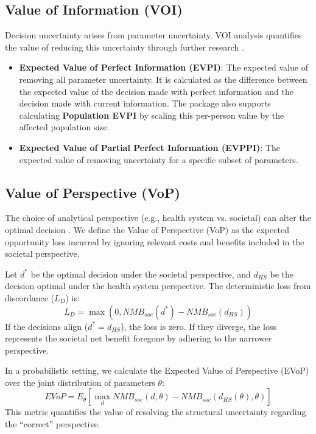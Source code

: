 \documentclass{article}
\begin{document}
\subsection{Value of Information (VOI)}
Decision uncertainty arises from parameter uncertainty. VOI analysis quantifies the value of reducing this uncertainty through further research \citep{claxton2001}.
\begin{itemize}
    \item \textbf{Expected Value of Perfect Information (EVPI)}: The expected value of removing all parameter uncertainty. It is calculated as the difference between the expected value of the decision made with perfect information and the decision made with current information. The package also supports calculating \textbf{Population EVPI} by scaling this per-person value by the affected population size.
    \item \textbf{Expected Value of Partial Perfect Information (EVPPI)}: The expected value of removing uncertainty for a specific subset of parameters.
\end{itemize}

\subsection{Value of Perspective (VoP)}
The choice of analytical perspective (e.g., health system vs. societal) can alter the optimal decision \citep{mordaunt2024ssrn}. We define the Value of Perspective (VoP) as the expected opportunity loss incurred by ignoring relevant costs and benefits included in the societal perspective.

Let $d^*$ be the optimal decision under the societal perspective, and $d_{HS}$ be the decision optimal under the health system perspective. The deterministic loss from discordance ($L_D$) is:
\begin{equation} \label{eq:discordance}
L_D = \max(0, NMB_{soc}(d^*) - NMB_{soc}(d_{HS}))
\end{equation}
If the decisions align ($d^* = d_{HS}$), the loss is zero. If they diverge, the loss represents the societal net benefit foregone by adhering to the narrower perspective.

In a probabilistic setting, we calculate the Expected Value of Perspective (EVoP) over the joint distribution of parameters $\theta$:
\begin{equation} \label{eq:evop}
EVoP = E_{\theta} \left[ \max_d NMB_{soc}(d, \theta) - NMB_{soc}(d_{HS}(\theta), \theta) \right]
\end{equation}
This metric quantifies the value of resolving the structural uncertainty regarding the ``correct'' perspective.
\end{document}
